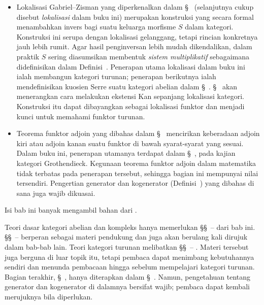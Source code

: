 \begin{itemize}
	\item Lokalisasi Gabriel--Zisman yang diperkenalkan dalam
	\S~ (selanjutnya cukup disebut
	\emph{lokalisasi} dalam buku ini) merupakan konstruksi yang secara formal
	menambahkan invers bagi suatu keluarga morfisme $S$ dalam kategori.
	Konstruksi ini serupa dengan lokalisasi gelanggang, tetapi rincian
	konkretnya jauh lebih rumit. Agar hasil penginversan lebih mudah
	dikendalikan, dalam praktik $S$ sering diasumsikan membentuk
	\emph{sistem multiplikatif} sebagaimana didefinisikan dalam
	Definisi~. Penerapan
	utama lokalisasi dalam buku ini ialah membangun kategori turunan; penerapan
	berikutnya ialah mendefinisikan kuosien Serre suatu kategori abelian dalam
	\S~.
	\S~ akan menerangkan cara
	melakukan ekstensi Kan sepanjang lokalisasi kategori. Konstruksi itu dapat
	dibayangkan sebagai lokalisasi funktor dan menjadi kunci untuk memahami
	funktor turunan.

	\item Teorema funktor adjoin yang dibahas dalam
	\S~ mencirikan keberadaan adjoin kiri atau
	adjoin kanan suatu funktor di bawah syarat-syarat yang sesuai. Dalam buku
	ini, penerapan utamanya terdapat dalam
	\S~, pada kajian kategori
	Grothendieck. Kegunaan teorema funktor adjoin dalam matematika tidak
	terbatas pada penerapan tersebut, sehingga bagian ini mempunyai nilai
	tersendiri. Pengertian generator dan kogenerator
	(Definisi~) yang dibahas di sana
	juga wajib dikuasai.
\end{itemize}

Isi bab ini banyak mengambil bahan dari \cite{KS06, Rie16}.

\begin{petunjukbacaan}
Teori dasar kategori abelian dan kompleks hanya memerlukan
\S\S~--%
 dari bab ini.
\S\S~--%
 berperan sebagai materi pendukung dan
juga akan berulang kali dirujuk dalam bab-bab lain. Teori kategori turunan
melibatkan \S\S~--%
. Materi tersebut juga berguna di
luar topik itu, tetapi pembaca dapat menimbang kebutuhannya sendiri dan
menunda pembacaan hingga sebelum mempelajari kategori turunan. Bagian terakhir,
\S~, hanya diterapkan dalam
\S~. Namun, pengetahuan tentang
generator dan kogenerator di dalamnya bersifat wajib; pembaca dapat kembali
merujuknya bila diperlukan.
\end{petunjukbacaan}
